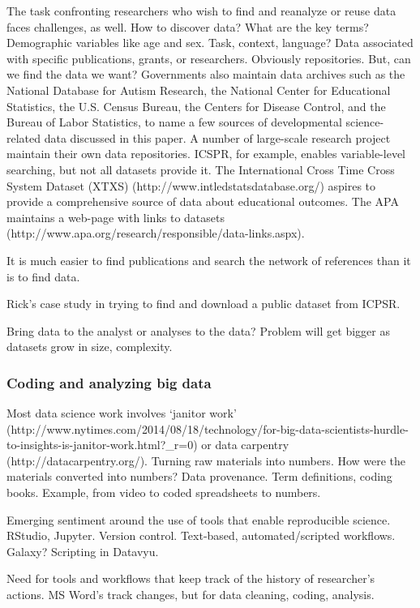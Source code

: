 \documentclass[letterpaper,man,apacite]{apa6}
\begin{document}

The task confronting researchers who wish to find and reanalyze or reuse data faces challenges, as well.
How to discover data?
What are the key terms? Demographic variables like age and sex. Task, context, language?
Data associated with specific publications, grants, or researchers.
Obviously repositories.
But, can we find the data we want?
Governments also maintain data archives such as the National Database for Autism Research, the National Center for Educational Statistics, the U.S. Census Bureau, the Centers for Disease Control, and the Bureau of Labor Statistics, to name a few sources of developmental science-related data discussed in this paper.
A number of large-scale research project maintain their own data repositories.
ICSPR, for example, enables variable-level searching, but not all datasets provide it.
The International Cross Time Cross System Dataset (XTXS) (http://www.intledstatsdatabase.org/) aspires to provide a comprehensive source of data about educational outcomes.
The APA maintains a web-page with links to datasets (http://www.apa.org/research/responsible/data-links.aspx).

It is much easier to find publications and search the network of references than it is to find data.

Rick's case study in trying to find and download a public dataset from ICPSR.

Bring data to the analyst or analyses to the data?
Problem will get bigger as datasets grow in size, complexity.

\subsubsection{Coding and analyzing big data}

Most data science work involves `janitor work' (http://www.nytimes.com/2014/08/18/technology/for-big-data-scientists-hurdle-to-insights-is-janitor-work.html?_r=0) or data carpentry (http://datacarpentry.org/).
Turning raw materials into numbers.
How were the materials converted into numbers?
Data provenance.
Term definitions, coding books.
Example, from video to coded spreadsheets to numbers.

Emerging sentiment around the use of tools that enable reproducible science.
RStudio, Jupyter.
Version control.
Text-based, automated/scripted workflows. Galaxy?
Scripting in Datavyu.

Need for tools and workflows that keep track of the history of researcher's actions.
MS Word's track changes, but for data cleaning, coding, analysis.
\end{document}
